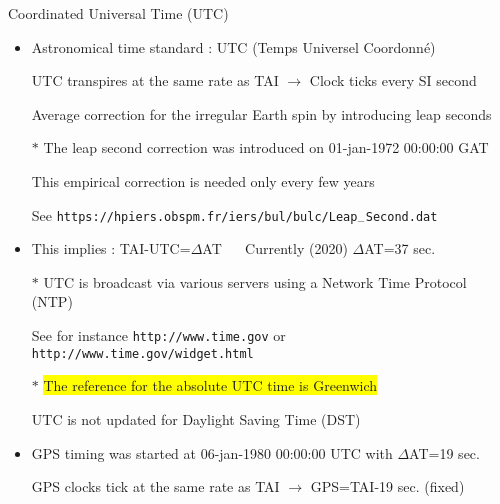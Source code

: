 \Tr
\begin{center}
{\red Coordinated Universal Time (UTC)}
\end{center}
%
\begin{itemize}
\item Astronomical time standard : {\blue UTC (Temps Universel Coordonn\'{e})}
\item[] UTC transpires at the same rate as TAI $\rightarrow$ Clock ticks every SI second
\item[] Average correction for the irregular Earth spin by introducing {\blue leap seconds}
\item[$\ast$] The leap second correction was introduced on 01-jan-1972 00:00:00 GAT
\item[] This empirical correction is needed only every few years
\item[] See {\tt https://hpiers.obspm.fr/iers/bul/bulc/Leap}$_{-}${\tt Second.dat}
\item This implies : {\blue TAI-UTC=$\Delta$AT} $\quad$ Currently (2020) $\Delta$AT=37 sec. 
\item[$\ast$] UTC is broadcast via various servers using a Network Time Protocol (NTP)
\item[] See for instance {\tt http://www.time.gov} or {\tt http://www.time.gov/widget.html}
\item[$\ast$] \colorbox{yellow}{The reference for the absolute UTC time is Greenwich}
\item[] UTC is not updated for Daylight Saving Time (DST)
\item GPS timing was started at 06-jan-1980 00:00:00 UTC with $\Delta$AT=19 sec.
\item[] GPS clocks tick at the same rate as TAI $\rightarrow$ {\blue GPS=TAI-19 sec.} (fixed)
\end{itemize}

